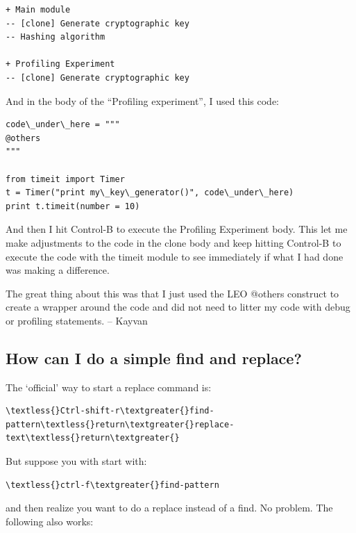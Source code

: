 \documentclass[a4paper,10pt,english]{sphinxmanual}
\begin{document}
\begin{Verbatim}[commandchars=\\\{\}]
+ Main module
-- [clone] Generate cryptographic key
-- Hashing algorithm

+ Profiling Experiment
-- [clone] Generate cryptographic key
\end{Verbatim}

And in the body of the ``Profiling experiment'', I used this code:

\begin{Verbatim}[commandchars=\\\{\}]
code\_under\_here = """
@others
"""

from timeit import Timer
t = Timer("print my\_key\_generator()", code\_under\_here)
print t.timeit(number = 10)
\end{Verbatim}

And then I hit Control-B to execute the Profiling Experiment body. This
let me make adjustments to the code in the clone body and keep hitting
Control-B to execute the code with the timeit module to see immediately
if what I had done was making a difference.

The great thing about this was that I just used the LEO @others construct
to create a wrapper around the code and did not need to litter my code
with debug or profiling statements.  -- Kayvan


\subsection{How can I do a simple find and replace?}
\label{FAQ:how-can-i-do-a-simple-find-and-replace}
The `official' way to start a replace command is:

\begin{Verbatim}[commandchars=\\\{\}]
\textless{}Ctrl-shift-r\textgreater{}find-pattern\textless{}return\textgreater{}replace-text\textless{}return\textgreater{}
\end{Verbatim}

But suppose you with start with:

\begin{Verbatim}[commandchars=\\\{\}]
\textless{}ctrl-f\textgreater{}find-pattern
\end{Verbatim}

and then realize you want to do a replace instead of a find.
No problem.  The following also works:
\end{document}

